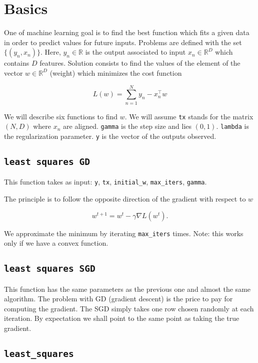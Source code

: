 \section{Basics}
\label{sec:basics}

One of machine learning goal is to find the best function which fits a given data in order to predict values for future inputs. Problems are defined with the set $\{(y_n, x_n)\}$. Here, $y_n \in \mathbb{R}$ is the output associated to input $x_n \in \mathbb{R}^D$ which contains $D$ features. Solution consists to find the values of the element of the vector $w \in \mathbb{R}^D$ (weight) which minimizes the cost function

\[ L(w) = \sum_{n=1}^{N} y_n - x_n^\intercal w \]

We will describe six functions to find $w$. We will assume \texttt{tx} stands for the matrix $(N, D)$ where $x_n$ are aligned. \texttt{gamma} is the step size and lies $(0, 1)$. \texttt{lambda} is the regularization parameter. \texttt{y} is the vector of the outputs observed.

\subsection{\texttt{least squares GD}}

This function takes as input: \texttt{y}, \texttt{tx}, \texttt{initial\_w}, \texttt{max\_iters}, \texttt{gamma}.

The principle is to follow the opposite direction of the gradient with respect to $w$

\[ w^{t+1} = w^{t} - \gamma \nabla L(w^{t}). \]

We approximate the minimum by iterating \texttt{max\_iters} times. Note: this works only if we have a convex function.


\subsection{\texttt{least squares SGD}}

This function has the same parameters as the previous one and almost the same algorithm. The problem with GD (gradient descent) is the price to pay for computing the gradient. The SGD simply takes one row chosen randomly at each iteration. By expectation we shall point to the same point as taking the true gradient.

\subsection{\texttt{least\_squares}}

